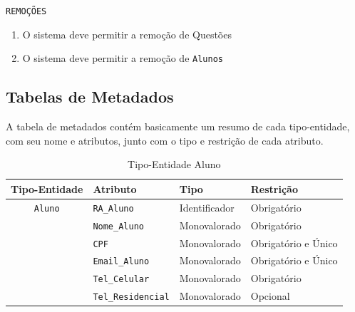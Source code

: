\documentclass[12pt,a4paper]{article}
\begin{document}
\vspace{0.5cm}
\begin{center}
    \texttt{REMOÇÕES}
\end{center}
\begin{enumerate}
    \item O sistema deve permitir a remoção de Questões
    \item O sistema deve permitir a remoção de \texttt{Alunos}
\end{enumerate}


\pagebreak

\subsection{Tabelas de Metadados}
A tabela de metadados contém basicamente um resumo de cada tipo-entidade, com seu nome e atributos, junto com o tipo e restrição de cada atributo.

\begin{table}[h]
  \centering
  \caption{Tipo-Entidade Aluno}
    \begin{tabular}{|c|c|l|l|l|}
    \toprule\hline
    \multicolumn{2}{|c|}{\textbf{Tipo-Entidade}} & \textbf{Atributo} & \textbf{Tipo} & \textbf{Restrição} \\\hline
    \midrule
    \multicolumn{2}{|c|}{\texttt{Aluno}} & \texttt{RA\_Aluno} & Identificador & Obrigatório \\
    \midrule
    \multicolumn{2}{|c|}{} & \texttt{Nome\_Aluno} & Monovalorado & Obrigatório \\
    \midrule
    \multicolumn{2}{|c|}{} & \texttt{CPF}   & Monovalorado & Obrigatório e Único \\
    \midrule
    \multicolumn{2}{|c|}{} & \texttt{Email\_Aluno} & Monovalorado & Obrigatório e Único \\
    \midrule
    \multicolumn{2}{|c|}{} & \texttt{Tel\_Celular} & Monovalorado & Obrigatório \\
    \midrule
    \multicolumn{2}{|c|}{} & \texttt{Tel\_Residencial} & Monovalorado & Opcional \\
    \bottomrule\hline
    \end{tabular}%
  \label{tab:meta_aluno}%
\end{table}%
\end{document}
